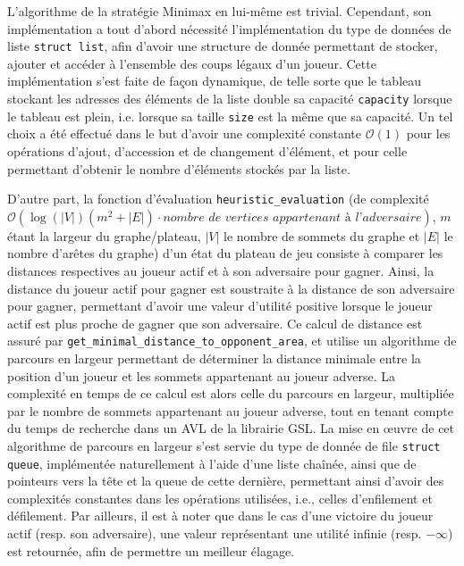 \documentclass[11pt]{article}
\begin{document}
L'algorithme de la stratégie Minimax en lui-même est trivial. Cependant, son implémentation a tout d'abord nécessité l'implémentation du type de données de liste \texttt{struct list}, afin d'avoir une structure de donnée permettant de stocker, ajouter et accéder à l'ensemble des coups légaux d'un joueur. Cette implémentation s'est faite de façon dynamique, de telle sorte que le tableau stockant les adresses des éléments de la liste double sa capacité \texttt{capacity} lorsque le tableau est plein, i.e. lorsque sa taille \texttt{size} est la même que sa capacité. Un tel choix a été effectué dans le but d'avoir une complexité constante $\mathcal{O}(1)$ pour les opérations d'ajout, d'accession et de changement d'élément, et pour celle permettant d'obtenir le nombre d'éléments stockés par la liste.

D'autre part, la fonction d'évaluation \texttt{heuristic\_evaluation} (de complexité $\mathcal{O}(\log(|V|)(m^{2}+|E|)\cdot\textit{nombre de vertices appartenant à l'adversaire})$, $m$ étant la largeur du graphe/plateau, $|V|$ le nombre de sommets du graphe et $|E|$ le nombre d'arêtes du graphe) d'un état du plateau de jeu consiste à comparer les distances respectives au joueur actif et à son adversaire pour gagner. Ainsi, la distance du joueur actif pour gagner est soustraite à la distance de son adversaire pour gagner, permettant d'avoir une valeur d'utilité positive lorsque le joueur actif est plus proche de gagner que son adversaire. Ce calcul de distance est assuré par \texttt{get\_minimal\_distance\_to\_opponent\_area}, et utilise un algorithme de parcours en largeur permettant de déterminer la distance minimale entre la position d'un joueur et les sommets appartenant au joueur adverse. La complexité en temps de ce calcul est alors celle du parcours en largeur, multipliée par le nombre de sommets appartenant au joueur adverse, tout en tenant compte du temps de recherche dans un AVL de la librairie GSL. La mise en \oe uvre de cet algorithme de parcours en largeur s'est servie du type de donnée de file \texttt{struct queue}, implémentée naturellement à l'aide d'une liste chaînée, ainsi que de pointeurs vers la tête et la queue de cette dernière, permettant ainsi d'avoir des complexités constantes dans les opérations utilisées, i.e., celles d'enfilement et défilement. Par ailleurs, il est à noter que dans le cas d'une victoire du joueur actif (resp. son adversaire), une valeur représentant une utilité infinie (resp. $-\infty$) est retournée, afin de permettre un meilleur élagage.
\end{document}
